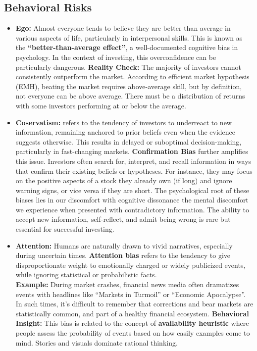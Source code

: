 \documentclass[12pt]{article}
\begin{document}
\subsection{Behavioral Risks}
  \begin{itemize}
  \item \textbf{Ego:} Almost everyone tends to believe they are better than average in various aspects of life, particularly in interpersonal skills. This is known as the \textbf{``better-than-average effect''}, a well-documented cognitive bias in psychology. In the context of investing, this overconfidence can be particularly dangerous.
  \textbf{Reality Check:} The majority of investors cannot consistently outperform the market. According to efficient market hypothesis (EMH), beating the market requires above-average skill, but by definition, not everyone can be above average. There must be a distribution of returns with some investors performing at or below the average.

  \item \textbf{Coservatism:} refers to the tendency of investors to underreact to new information, remaining anchored to prior beliefs even when the evidence suggests otherwise. This results in delayed or suboptimal decision-making, particularly in fast-changing markets.
  \textbf{Confirmation Bias} further amplifies this issue. Investors often search for, interpret, and recall information in ways that confirm their existing beliefs or hypotheses. For instance, they may focus on the positive aspects of a stock they already own (if long) and ignore warning signs, or vice versa if they are short.
  The psychological root of these biases lies in our discomfort with cognitive dissonance the mental discomfort we experience when presented with contradictory information. The ability to accept new information, self-reflect, and admit being wrong is rare but essential for successful investing.

  \item \textbf{Attention:} Humans are naturally drawn to vivid narratives, especially during uncertain times. \textbf{Attention bias} refers to the tendency to give disproportionate weight to emotionally charged or widely publicized events, while ignoring statistical or probabilistic facts.\\
  \textbf{Example:} During market crashes, financial news media often dramatizes events with headlines like “Markets in Turmoil” or “Economic Apocalypse”. In such times, it's difficult to remember that corrections and bear markets are statistically common, and part of a healthy financial ecosystem.
  \textbf{Behavioral Insight:} This bias is related to the concept of \textbf{availability heuristic} where people assess the probability of events based on how easily examples come to mind. Stories and visuals dominate rational thinking.


\end{itemize}
\end{document}
